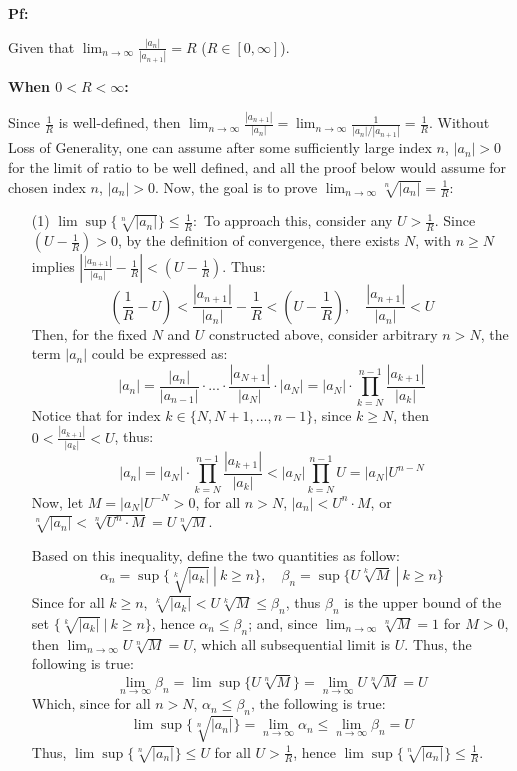 \documentclass{article}
\begin{document}
\textbf{Pf:}

Given that $\lim_{n\rightarrow\infty}\frac{|a_n|}{|a_{n+1}|}=R$ ($R\in [0,\infty]$).

\hfill

\textbf{When $0<R<\infty$:}

Since $\frac{1}{R}$ is well-defined, then $\lim_{n\rightarrow\infty}\frac{|a_{n+1}|}{|a_n|}=\lim_{n\rightarrow\infty}\frac{1}{|a_{n}|/|a_{n+1}|}=\frac{1}{R}$.
Without Loss of Generality, one can assume after some sufficiently large index $n$, $|a_n|>0$ for the limit of ratio to be well defined, and all the proof below would 
assume for chosen index $n$, $|a_n|>0$.
Now, the goal is to prove $\lim_{n\rightarrow\infty}\sqrt[n]{|a_n|}=\frac{1}{R}$:
\begin{itemize}
    \item[(1)] $\lim\sup \{\sqrt[n]{|a_n|}\}\leq \frac{1}{R}:$ To approach this, consider any $U>\frac{1}{R}$. Since $(U-\frac{1}{R})>0$, by the definition of convergence,
    there exists $N$, with $n\geq N$ implies $\left|\frac{|a_{n+1}|}{|a_n|}-\frac{1}{R}\right|<(U-\frac{1}{R})$. Thus:
    $$\left(\frac{1}{R}-U\right)<\frac{|a_{n+1}|}{|a_n|}-\frac{1}{R}<\left(U-\frac{1}{R}\right),\quad \frac{|a_{n+1}|}{|a_n|}<U$$
    Then, for the fixed $N$ and $U$ constructed above, consider arbitrary $n>N$, the term $|a_n|$ could be expressed as:
    $$|a_n|=\frac{|a_n|}{|a_{n-1}|}\cdot...\cdot\frac{|a_{N+1}|}{|a_N|}\cdot|a_N| = |a_N|\cdot\prod_{k=N}^{n-1}\frac{|a_{k+1}|}{|a_k|}$$
    Notice that for index $k\in\{N,N+1,...,n-1\}$, since $k\geq N$, then $0< \frac{|a_{k+1}|}{|a_k|}<U$, thus:
    $$|a_n| = |a_N|\cdot\prod_{k=N}^{n-1}\frac{|a_{k+1}|}{|a_k|} < |a_N|\prod_{k=N}^{n-1}U =  |a_N|U^{n-N}$$
    Now, let $M=|a_N|U^{-N}>0$, for all $n>N$, $|a_n|<U^n\cdot M$, or $\sqrt[n]{|a_n|}<\sqrt[n]{U^n\cdot M} = U\sqrt[n]{M}$.

    Based on this inequality, define the two quantities as follow:
    $$\alpha_n = \sup\{\sqrt[k]{|a_k|}\ |\ k\geq n\},\quad \beta_n = \sup\{U\sqrt[k]{M}\ |\ k\geq n\}$$
    Since for all $k\geq n$, $\sqrt[k]{|a_k|}<U\sqrt[k]{M}\leq \beta_n$, thus $\beta_n$ is the upper bound of the set $\{\sqrt[k]{|a_k|}\ |\ k\geq n\}$, hence $\alpha_n\leq \beta_n$;
    and, since $\lim_{n\rightarrow\infty}\sqrt[n]{M}=1$ for $M>0$, then $\lim_{n\rightarrow\infty}U\sqrt[n]{M}=U$, which all subsequential limit is $U$. Thus, the following is true:
    $$\lim_{n\rightarrow\infty}\beta_n =  \lim\sup\{U\sqrt[n]{M}\}=\lim_{n\rightarrow\infty}U\sqrt[n]{M}=U$$
    Which, since for all $n>N$, $\alpha_n\leq \beta_n$, the following is true:
    $$\lim\sup\{\sqrt[n]{|a_n|}\}=\lim_{n\rightarrow\infty}\alpha_n \leq \lim_{n\rightarrow\infty}\beta_n = U$$
    Thus, $\lim\sup\{\sqrt[n]{|a_n|}\}\leq U$ for all $U>\frac{1}{R}$, hence $\lim\sup\{\sqrt[n]{|a_n|}\}\leq \frac{1}{R}$.


\end{itemize}
\end{document}
